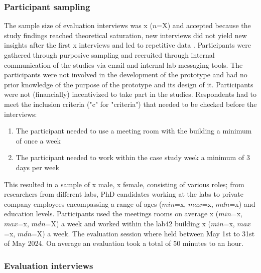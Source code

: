 \subsubsection{Participant sampling}

The sample size of evaluation interviews was x ($n$=X) and accepted because the study findings reached theoretical saturation, new interviews did not yield new insights after the first x interviews and led to repetitive data \cite{steph_menken_introduction_2016}. Participants were gathered through purposive sampling and recruited through internal communication of the studies via email and internal lab messaging tools. The participants were not involved in the development of the prototype and had no prior knowledge of the purpose of the prototype and its design of it. Participants were not (financially) incentivized to take part in the studies. Respondents had to meet the inclusion criteria ("c" for "criteria") that needed to be checked before the interviews: 

\begin{enumerate}
    \renewcommand{\labelenumi}{C\arabic{enumi}:}
    \item The participant needed to use a meeting room with the building a minimum of once a week
    \item The participant needed to work within the case study week a minimum of 3 days per week
\end{enumerate}

This resulted in a sample of x male, x female, consisting of various roles; from researchers from different labs, PhD candidates working at the labs to private company employees encompassing a range of ages ($min$=x, $max$=x, $mdn$=x) and education levels. Participants used the meetings rooms on average x ($min$=x, $max$=x, $mdn$=X) a week and worked within the lab42 building x ($min$=x, $max$=x, $mdn$=X) a week. The evaluation session where held between May 1st to 31st of May 2024. On average an evaluation took a total of 50 minutes to an hour.

\subsubsection{Evaluation interviews}

